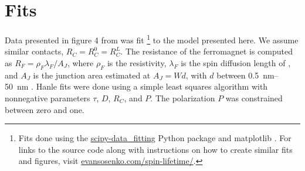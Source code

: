 \section{Fits}
\label{s:fits}

Data presented in figure 4 from \cite{PhysRevLett.105.167202}
was fit
\footnote{
  Fits done using the
  \href{https://github.com/razor-x/scipy-data_fitting}{scipy-data\_fitting}
  Python package and matplotlib \cite{Hunter:2007}.
  For links to the source code along with instructions
  on how to create similar fits and figures, visit
  \href{hhttp://evansosenko.com/spin-lifetime/}{evansosenko.com/spin-lifetime/}.
}
to the model presented here.
We assume similar contacts, $R_C = R_C^0 = R_C^L$.
The resistance of the ferromagnet  is computed as
$R_F = ρ_F λ_F / A_J$,
where $ρ_F$ is the  resistivity,
$λ_F$ is the spin diffusion length of ,
and $A_J$ is the junction area estimated at $A_J = W d$,
with $d$ between \SIrange[range-phrase={ and }]{0.5}{50}{\nano \meter}
\cite{PhysRevLett.105.167202}.
Hanle fits were done using a simple least squares algorithm
with nonnegative parameters $τ$, $D$, $R_C$, and $P$.
The polarization $P$ was constrained between zero and one.


